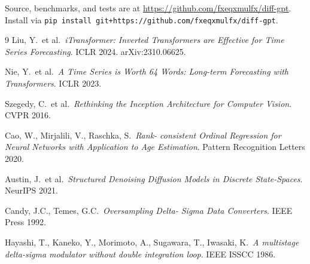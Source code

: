 \documentclass[11pt]{article}
\theoremstyle{remark}
\begin{document}
Source, benchmarks, and tests are at
\url{https://github.com/fxeqxmulfx/diff-gpt}. Install via
\texttt{pip install git+https://github.com/fxeqxmulfx/diff-gpt}.

\begin{thebibliography}{9}
 Liu, Y.\ et al.\ \emph{iTransformer: Inverted
Transformers are Effective for Time Series Forecasting}. ICLR 2024.
arXiv:2310.06625.

 Nie, Y.\ et al.\ \emph{A Time Series is Worth 64
Words: Long-term Forecasting with Transformers}. ICLR 2023.

 Szegedy, C.\ et al.\ \emph{Rethinking the
Inception Architecture for Computer Vision}. CVPR 2016.

 Cao, W., Mirjalili, V., Raschka, S.\ \emph{Rank-
consistent Ordinal Regression for Neural Networks with Application to
Age Estimation}. Pattern Recognition Letters 2020.

 Austin, J.\ et al.\ \emph{Structured Denoising
Diffusion Models in Discrete State-Spaces}. NeurIPS 2021.

 Candy, J.C., Temes, G.C.\ \emph{Oversampling Delta-
Sigma Data Converters}. IEEE Press 1992.

 Hayashi, T., Kaneko, Y., Morimoto, A.,
Sugawara, T., Iwasaki, K.\ \emph{A multistage delta-sigma modulator
without double integration loop}. IEEE ISSCC 1986.
\end{thebibliography}
\end{document}
